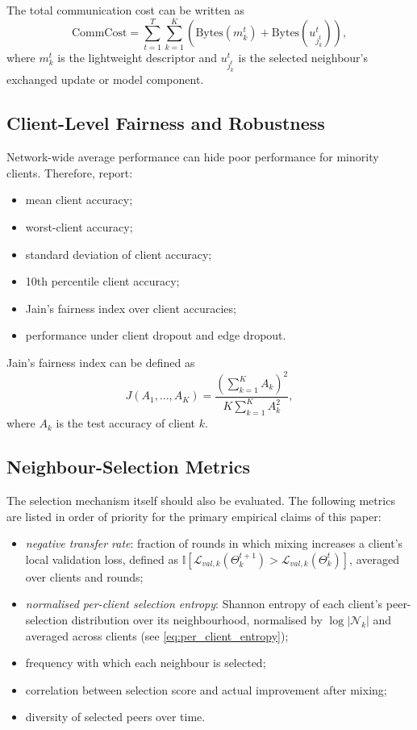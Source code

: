 \documentclass[conference]{IEEEtran}
\begin{document}
The total communication cost can be written as
\begin{equation}
    \text{CommCost}
    =
    \sum_{t=1}^{T}
    \sum_{k=1}^{K}
    \left(
    \text{Bytes}(m_k^t)
    +
    \text{Bytes}(u_{j_k^t}^t)
    \right),
    \label{eq:auto-100}
\end{equation}
where \(m_k^t\) is the lightweight descriptor and \(u_{j_k^t}^t\) is the selected neighbour's exchanged update or model component.

\subsection{Client-Level Fairness and Robustness}
\label{subsec:client-level-fairness-and-robustness}
Network-wide average performance can hide poor performance for minority clients. Therefore, report:
\begin{itemize}
    \item mean client accuracy;
    \item worst-client accuracy;
    \item standard deviation of client accuracy;
    \item 10th percentile client accuracy;
    \item Jain's fairness index over client accuracies;
    \item performance under client dropout and edge dropout.
\end{itemize}

Jain's fairness index can be defined as
\begin{equation}
    J(A_1,\dots,A_K)
    =
    \frac{(\sum_{k=1}^{K}A_k)^2}{K\sum_{k=1}^{K}A_k^2},
    \label{eq:auto-101}
\end{equation}
where \(A_k\) is the test accuracy of client \(k\).

\subsection{Neighbour-Selection Metrics}
\label{subsec:neighbour-selection-metrics}
The selection mechanism itself should also be evaluated. The following metrics are listed in order of priority for the primary empirical claims of this paper:
\begin{itemize}
    \item \emph{negative transfer rate}: fraction of rounds in which mixing increases a client's local validation loss, defined as $\mathbb{I}[\mathcal{L}_{val,k}(\Theta_k^{t+1}) > \mathcal{L}_{val,k}(\Theta_k^t)]$, averaged over clients and rounds;
    \item \emph{normalised per-client selection entropy}: Shannon entropy of each client's peer-selection distribution over its neighbourhood, normalised by $\log|\mathcal{N}_k|$ and averaged across clients (see \eqref{eq:per_client_entropy});
    \item frequency with which each neighbour is selected;
    \item correlation between selection score and actual improvement after mixing;
    \item diversity of selected peers over time.
\end{itemize}
\end{document}
